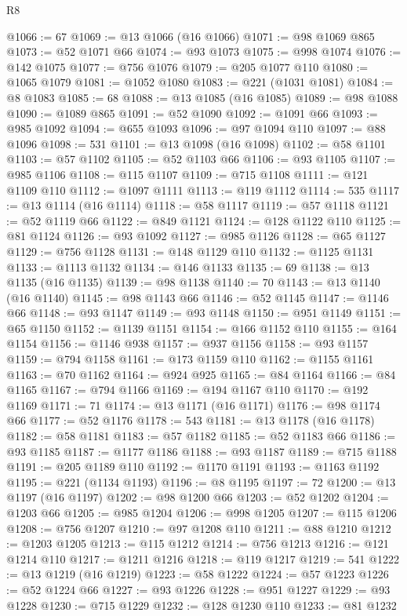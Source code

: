 \begin{lexlean}{R8}
\begin{coremodule}
@1066 := 67
@1069 := @13 @1066 (@16 @1066)
@1071 := @98 @1069 @865
@1073 := @52 @1071 @66
@1074 := @93 @1073
@1075 := @998 @1074
@1076 := @142 @1075
@1077 := @756 @1076
@1079 := @205 @1077 @110
@1080 := @1065 @1079
@1081 := @1052 @1080
@1083 := @221 (@1031 @1081)
@1084 := @8 @1083
@1085 := 68
@1088 := @13 @1085 (@16 @1085)
@1089 := @98 @1088
@1090 := @1089 @865
@1091 := @52 @1090
@1092 := @1091 @66
@1093 := @985 @1092
@1094 := @655 @1093
@1096 := @97 @1094 @110
@1097 := @88 @1096
@1098 := 531
@1101 := @13 @1098 (@16 @1098)
@1102 := @58 @1101
@1103 := @57 @1102
@1105 := @52 @1103 @66
@1106 := @93 @1105
@1107 := @985 @1106
@1108 := @115 @1107
@1109 := @715 @1108
@1111 := @121 @1109 @110
@1112 := @1097 @1111
@1113 := @119 @1112
@1114 := 535
@1117 := @13 @1114 (@16 @1114)
@1118 := @58 @1117
@1119 := @57 @1118
@1121 := @52 @1119 @66
@1122 := @849 @1121
@1124 := @128 @1122 @110
@1125 := @81 @1124
@1126 := @93 @1092
@1127 := @985 @1126
@1128 := @65 @1127
@1129 := @756 @1128
@1131 := @148 @1129 @110
@1132 := @1125 @1131
@1133 := @1113 @1132
@1134 := @146 @1133
@1135 := 69
@1138 := @13 @1135 (@16 @1135)
@1139 := @98 @1138
@1140 := 70
@1143 := @13 @1140 (@16 @1140)
@1145 := @98 @1143 @66
@1146 := @52 @1145
@1147 := @1146 @66
@1148 := @93 @1147
@1149 := @93 @1148
@1150 := @951 @1149
@1151 := @65 @1150
@1152 := @1139 @1151
@1154 := @166 @1152 @110
@1155 := @164 @1154
@1156 := @1146 @938
@1157 := @937 @1156
@1158 := @93 @1157
@1159 := @794 @1158
@1161 := @173 @1159 @110
@1162 := @1155 @1161
@1163 := @70 @1162
@1164 := @924 @925
@1165 := @84 @1164
@1166 := @84 @1165
@1167 := @794 @1166
@1169 := @194 @1167 @110
@1170 := @192 @1169
@1171 := 71
@1174 := @13 @1171 (@16 @1171)
@1176 := @98 @1174 @66
@1177 := @52 @1176
@1178 := 543
@1181 := @13 @1178 (@16 @1178)
@1182 := @58 @1181
@1183 := @57 @1182
@1185 := @52 @1183 @66
@1186 := @93 @1185
@1187 := @1177 @1186
@1188 := @93 @1187
@1189 := @715 @1188
@1191 := @205 @1189 @110
@1192 := @1170 @1191
@1193 := @1163 @1192
@1195 := @221 (@1134 @1193)
@1196 := @8 @1195
@1197 := 72
@1200 := @13 @1197 (@16 @1197)
@1202 := @98 @1200 @66
@1203 := @52 @1202
@1204 := @1203 @66
@1205 := @985 @1204
@1206 := @998 @1205
@1207 := @115 @1206
@1208 := @756 @1207
@1210 := @97 @1208 @110
@1211 := @88 @1210
@1212 := @1203 @1205
@1213 := @115 @1212
@1214 := @756 @1213
@1216 := @121 @1214 @110
@1217 := @1211 @1216
@1218 := @119 @1217
@1219 := 541
@1222 := @13 @1219 (@16 @1219)
@1223 := @58 @1222
@1224 := @57 @1223
@1226 := @52 @1224 @66
@1227 := @93 @1226
@1228 := @951 @1227
@1229 := @93 @1228
@1230 := @715 @1229
@1232 := @128 @1230 @110
@1233 := @81 @1232

\end{coremodule}
\end{lexlean}
